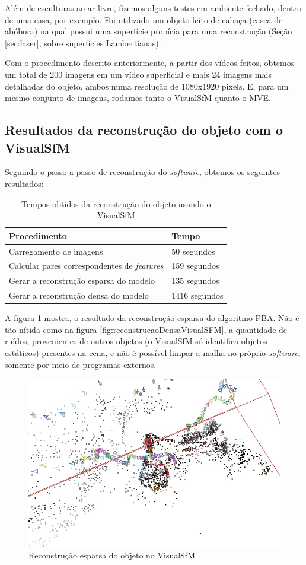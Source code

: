 
Além de esculturas ao ar livre, fizemos alguns testes em ambiente fechado, dentro de uma casa, por exemplo. Foi utilizado um objeto feito de cabaça (casca de abóbora) na qual possui uma superfície propícia para uma reconstrução (Seção \ref{sec:laser}, sobre superfícies Lambertianas). 

Com o procedimento descrito anteriormente, a partir dos vídeos feitos, obtemos um total de 200 imagens em um vídeo superficial e mais 24 imagens mais detalhadas do objeto, ambos numa resolução de 1080x1920 pixels. E, para um mesmo conjunto de imagens, rodamos tanto o VisualSfM quanto o MVE.

\subsection{Resultados da reconstrução do objeto com o VisualSfM}

Seguindo o passo-a-passo de reconstrução do \emph{software}, obtemos os seguintes resultados:

\begin{table}
\caption{Tempos obtidos da reconstrução do objeto usando o VisualSfM}
\label{tab:temposSfM}
\begin{tabular}{|l|p{4.7cm}|}
\hline
Procedimento & Tempo \\ \hline
Carregamento de imagens & 50 segundos \\ \hline
Calcular pares correspondentes de \emph{features} & 159 segundos \\ \hline
Gerar a reconstrução esparsa do modelo & 135 segundos \\ \hline
Gerar a reconstrução densa do modelo & 1416 segundos \\ \hline
\end{tabular}
\end{table}

A figura \ref{fig:reconstrucaoEsparsaVisualSFM} mostra, o resultado da reconstrução esparsa do algoritmo PBA. Não é tão nítida como na figura \ref{fig:reconstrucaoDensaVisualSFM}, a quantidade de ruídos, provenientes de outros objetos (o VisualSfM só identifica objetos estáticos) presentes na cena, e não é possível limpar a malha no próprio \emph{software}, somente por meio de programas externos.

\begin{figure}[!h]
	\centering
	\includegraphics[width=0.5\linewidth]{figs/galinhasparsa.jpg}
	\caption{%
	Reconstrução esparsa do objeto no VisualSfM
	}\label{fig:reconstrucaoEsparsaVisualSFM}
\end{figure}

